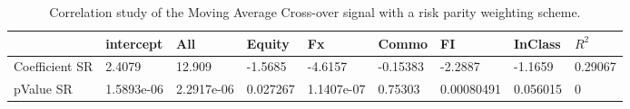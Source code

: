 \begin{table}[H]
\centering
\begin{tabular}{lllllllll}
\hline& intercept & All & Equity & Fx & Commo & FI & InClass & $R^{2}$ \\ 
\hline 
Coefficient SR & 2.4079 & 12.909 & -1.5685 & -4.6157 & -0.15383 & -2.2887 & -1.1659 & 0.29067 \\ 
pValue SR & 1.5893e-06 & 2.2917e-06 & 0.027267 & 1.1407e-07 & 0.75303 & 0.00080491 & 0.056015 & 0 \\ 
\hline
\end{tabular}
\caption{Correlation study of the Moving Average Cross-over signal with a risk parity weighting scheme.}
\label{MARP_CORR}
\end{table}